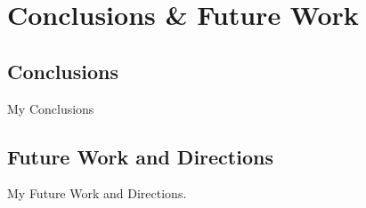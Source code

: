 \chapter{Conclusions \& Future Work}
\label{chap:conc}

\section{Conclusions}

My Conclusions

\section{Future Work and Directions}

My Future Work and Directions. 